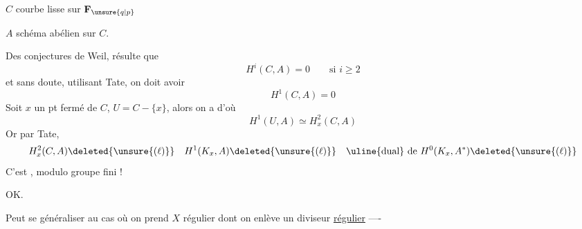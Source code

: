 $C$ courbe lisse  sur $\mathbf{F}_{\unsure{q|p}}$

$A$ schéma abélien sur $C$.

Des conjectures de Weil, résulte que
\[
H^i(C,A)=0\qquad\text{si }i\ge2
\]
et sans doute, utilisant Tate, on doit avoir
\[
H^1(C,A)=0
\]
Soit $x$ un pt fermé de $C$, $U=C-\{x\}$, alors on a
d'où
\[
H^1(U,A)\simeq H^2_x(C,A)
\]
Or par Tate,
\[
H^2_x(C,A)\deleted{\unsure{(\ell)}}\quad H^1(K_x,A)\deleted{\unsure{(\ell)}}\quad\uline{\text{dual}}\text{ de }H^0(K_x,A^*)\deleted{\unsure{(\ell)}}
\]
C'est , modulo groupe fini !

OK.

Peut se généraliser au cas où on prend $X$ régulier dont on enlève un diviseur \uline{régulier} ----
